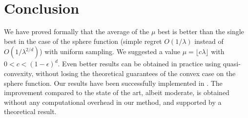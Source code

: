 \section{Conclusion}
We have proved formally that the average of the $\mu$ best is better than the single best in the case of the sphere function (simple regret $O(1/\lambda)$ instead of $O(1/\lambda^{2/d})$) with uniform sampling. We suggested a value $\mu=\lfloor c\lambda\rfloor$ with $0<c<(1-\epsilon)^{d}$. Even better results can be obtained in practice using quasi-convexity, without losing the theoretical guarantees of the convex case on the sphere function. Our results have been successfully implemented in \cite{nevergrad}. The improvement compared to the state of the art, albeit moderate, is obtained without any computational overhead in our method, and supported by a theoretical result.\\


